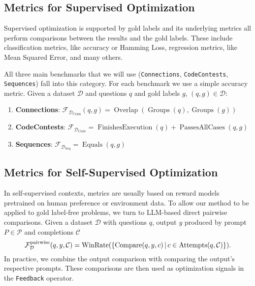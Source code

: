 \subsection{Metrics for Supervised Optimization}
Supervised optimization is supported by gold labels and its underlying metrics all perform comparisons between the results and the gold labels.
These include classification metrics, like accuracy or Hamming Loss, regression metrics, like Mean Squared Error, and many others.

All three main benchmarks that we will use (\texttt{Connections}, \texttt{CodeContests}, \texttt{Sequences}) 
fall into this category. For each benchmark we use a simple accuracy metric. Given a dataset $\mathcal{D}$ and questions $q$ and gold labels $g$, $(q,g) \in \mathcal{D}$:
\begin{enumerate}
    \item \textbf{Connections}:  $\mathcal{F}_{\mathcal{D}_{\text{Conn}}}(q, g) = \operatorname{Overlap}(\operatorname{Groups}(q), \operatorname{Groups}(g))$
    \item \textbf{CodeContests}: $\mathcal{F}_{\mathcal{D}_{\text{Code}}} = \operatorname{FinishesExecution}(q) + \operatorname{PassesAllCases}(q, g)$
    \item \textbf{Sequences}: $\mathcal{F}_{\mathcal{D}_{\text{Seq}}} = \operatorname{Equals}(q, g)$
\end{enumerate} 

\subsection{Metrics for Self-Supervised Optimization}\label{sec:ssometrics}
In self-supervised contexts, metrics are usually based on reward models pretrained on human preference or environment data.
To allow our method to be applied to gold label-free problems, we turn to LLM-based direct pairwise comparisons.
Given a dataset $\mathcal{D}$ with questions $q$, output $y$ produced by prompt $P \in \mathcal{P}$ and completions $\mathcal{C}$
\begin{equation}
    \mathcal{F}_{\mathcal{D}}^{\text{pairwise}}(q, y, \mathcal{C}) = \operatorname{WinRate}(\{\operatorname{Compare}(q,y,c)\, \vert \, c\in\operatorname{Attempts}(q,\mathcal{C})\}).
\end{equation}
In practice, we combine the output comparison with comparing the output's respective prompts.
These comparisons are then used as optimization signals in the \texttt{Feedback} operator.


